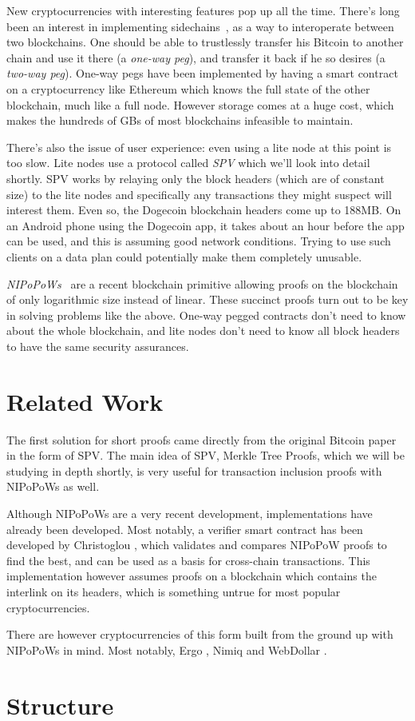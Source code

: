 New cryptocurrencies with interesting features pop up all the time. There's long been an interest in implementing sidechains~\cite{sidechains}, as a way to interoperate between two blockchains. One should be able to trustlessly transfer his Bitcoin to another chain and use it there (a \emph{one-way peg}), and transfer it back if he so desires (a \emph{two-way peg}). One-way pegs have been implemented by having a smart contract on a cryptocurrency like Ethereum which knows the full state of the other blockchain, much like a full node. However storage comes at a huge cost, which makes the hundreds of GBs of most blockchains infeasible to maintain.

There's also the issue of user experience: even using a lite node at this point is too slow. Lite nodes use a protocol called \emph{SPV} which we'll look into detail shortly. SPV works by relaying only the block headers (which are of constant size) to the lite nodes and specifically any transactions they might suspect will interest them. Even so, the Dogecoin blockchain headers come up to 188MB. On an Android phone using the Dogecoin app, it takes about an hour before the app can be used, and this is assuming good network conditions. Trying to use such clients on a data plan could potentially make them completely unusable.

\emph{NIPoPoWs}~\cite{nipopows} are a recent blockchain primitive allowing proofs on the blockchain of only logarithmic size instead of linear. These succinct proofs turn out to be key in solving problems like the above. One-way pegged contracts don't need to know about the whole blockchain, and lite nodes don't need to know all block headers to have the same security assurances.

\section{Related Work}
The first solution for short proofs came directly from the original Bitcoin paper \cite{bitcoin} in the form of SPV. The main idea of SPV, Merkle Tree Proofs, which we will be studying in depth shortly, is very useful for transaction inclusion proofs with NIPoPoWs as well.

Although NIPoPoWs are a very recent development, implementations have already been developed. Most notably, a verifier smart contract has been developed by Christoglou \cite{christoglou}, which validates and compares NIPoPoW proofs to find the best, and can be used as a basis for cross-chain transactions. This implementation however assumes proofs on a blockchain which contains the interlink on its headers, which is something untrue for most popular cryptocurrencies.

There are however cryptocurrencies of this form built from the ground up with NIPoPoWs in mind. Most notably, Ergo \cite{ergo}, Nimiq \cite{nimiq} and WebDollar \cite{webdollar}.

\section{Structure}

